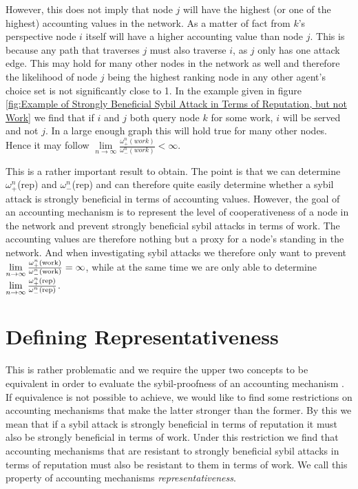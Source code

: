 \begin{example}[]
\noindent{}However, this does not imply that node $j$ will have the highest (or one of the highest) accounting values in the network. As a matter of fact from $k$'s perspective node $i$ itself will have a higher accounting value than node $j$. This is because any path that traverses $j$ must also traverse $i$, as $j$ only has one attack edge. This may hold for many other nodes in the network as well and therefore the likelihood of node $j$ being the highest ranking node in any other agent's choice set is not significantly close to 1. In the example given in figure \ref{fig:Example of Strongly Beneficial Sybil Attack in Terms of Reputation, but not Work} we find that if $i$ and $j$ both query node $k$ for some work, $i$ will be served and not $j$. In a large enough graph this will hold true for many other nodes. Hence it may follow $\lim\limits_{n\rightarrow\infty}\frac{\omega^n_{+}(work)}{\omega^n_{-}(work)}<\infty$. \vspace{1em}\\
\end{example}

\noindent{}This is a rather important result to obtain. The point is that we can determine $\omega^n_{+}$(rep) and $\omega^n_{-}$(rep) and can therefore quite easily determine whether a sybil attack is strongly beneficial in terms of accounting values. However, the goal of an accounting mechanism is to represent the level of cooperativeness of a node in the network and prevent strongly beneficial sybil attacks in terms of work. The accounting values are therefore nothing but a proxy for a node's standing in the network. And when investigating sybil attacks we therefore only want to prevent $\lim\limits_{n\rightarrow\infty}\frac{\omega^n_{+}({\rm work})}{\omega^n_{-}({\rm work})}=\infty$, while at the same time we are only able to determine $\lim\limits_{n\rightarrow\infty}\frac{\omega^n_{+}({\rm rep})}{\omega^n_{-}({\rm rep})}$. \vspace{1em}\\

\section{Defining Representativeness}
\label{sec:Defining Representativeness}
\noindent{}This is rather problematic and we require the upper two concepts to be equivalent in order to evaluate the sybil-proofness of an accounting mechanism . If equivalence is not possible to achieve, we would like to find some restrictions on accounting mechanisms that make the latter stronger than the former. By this we mean that if a sybil attack is strongly beneficial in terms of reputation it must also be strongly beneficial in terms of work. Under this restriction we find that accounting mechanisms that are resistant to strongly beneficial sybil attacks in terms of reputation must also be resistant to them in terms of work. We call this property of accounting mechanisms {\it representativeness}. \vspace{1em}\\

